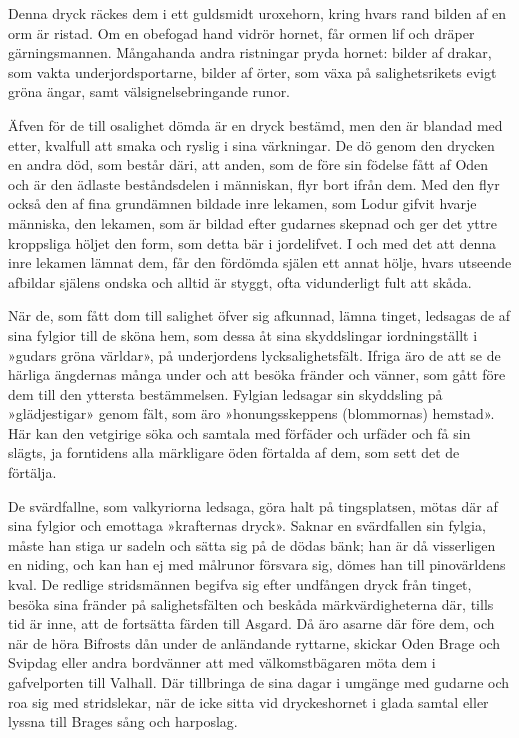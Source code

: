Denna dryck räckes dem i ett guldsmidt uroxehorn, kring hvars rand
bilden af en orm är ristad. Om en obefogad hand vidrör hornet, får ormen
lif och dräper gärningsmannen. Mångahanda andra ristningar pryda hornet:
bilder af drakar, som vakta underjordsportarne, bilder af örter, som
växa på salighetsrikets evigt gröna ängar, samt välsignelsebringande
runor.

Äfven för de till osalighet dömda är en dryck bestämd, men den är
blandad med etter, kvalfull att smaka och ryslig i sina värkningar. De
dö genom den drycken en andra död, som består däri, att anden, som de
före sin födelse fått af Oden och är den ädlaste beståndsdelen i
människan, flyr bort ifrån dem. Med den flyr också den af fina
grundämnen bildade inre lekamen, som Lodur gifvit hvarje människa, den
lekamen, som är bildad efter gudarnes skepnad och ger det yttre
kroppsliga höljet den form, som detta bär i jordelifvet. I och med det
att denna inre lekamen lämnat dem, får den fördömda själen ett annat
hölje, hvars utseende afbildar själens ondska och alltid är styggt, ofta
vidunderligt fult att skåda.

När de, som fått dom till salighet öfver sig afkunnad, lämna tinget,
ledsagas de af sina fylgior till de sköna hem, som dessa åt sina
skyddslingar iordningställt i »gudars gröna världar», på underjordens
lycksalighetsfält. Ifriga äro de att se de härliga ängdernas många under
och att besöka fränder och vänner, som gått före dem till den yttersta
bestämmelsen. Fylgian ledsagar sin skyddsling på »glädjestigar» genom
fält, som äro »honungsskeppens (blommornas) hemstad». Här kan den
vetgirige söka och samtala med förfäder och urfäder och få sin slägts,
ja forntidens alla märkligare öden förtalda af dem, som sett det de
förtälja.

De svärdfallne, som valkyriorna ledsaga, göra halt på tingsplatsen,
mötas där af sina fylgior och emottaga
»krafternas
dryck». Saknar en svärdfallen sin fylgia, måste han stiga ur sadeln och
sätta sig på de dödas bänk; han är då visserligen en niding, och kan han
ej med målrunor försvara sig, dömes han till pinovärldens kval. De
redlige stridsmännen begifva sig efter undfången dryck från tinget,
besöka sina fränder på salighetsfälten och beskåda märkvärdigheterna
där, tills tid är inne, att de fortsätta färden till Asgard. Då äro
asarne där före dem, och när de höra Bifrosts dån under de anländande
ryttarne, skickar Oden Brage och Svipdag eller andra bordvänner att med
välkomstbägaren möta dem i gafvelporten till Valhall. Där tillbringa de
sina dagar i umgänge med gudarne och roa sig med stridslekar, när de
icke sitta vid dryckeshornet i glada samtal eller lyssna till Brages
sång och harposlag.

